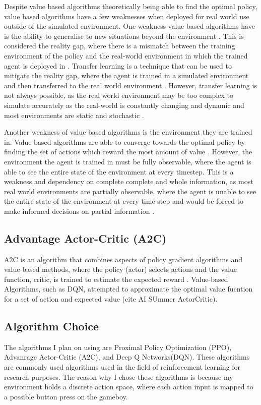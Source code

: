 Despite value based algorithms theoretically being able to find the optimal policy, value based algorithms have a few weaknesses when deployed for real world use outside of the simulated environment. One weakness value based algorithms have is the ability to generalise to new situations beyond the environment \cite{OdelTruxillo2023}. This is considered the reality gap, where there is a mismatch between the training environment of the policy and the real-world environment in which the trained agent is deployed in \cite{tobin2017domain}. Transfer learning is a technique that can be used to mitigate the reality gap, where the agent is trained in a simulated environment and then transferred to the real world environment \cite{OdelTruxillo2023}. However, transfer learning is not always possible, as the real world environment may be too complex to simulate accurately as the real-world is constantly changing and dynamic and most environments are static and stochastic \cite{OdelTruxillo2023}. 

Another weakness of value based algorithms is the environment they are trained in. Value based algorithms are able to converge towards the optimal policy by finding the set of actions which reward the most amount of value \cite{OdelTruxillo2023}. However, the environment the agent is trained in must be fully observable, where the agent is able to see the entire state of the environment at every timestep. This is a weakness and dependency on complete complete and whole information, as most real world environments are partially observable, where the agent is unable to see the entire state of the environment at every time step and would be forced to make informed decisions on partial information \cite{dulac2021challenges}. 

\subsection{Advantage Actor-Critic (A2C)}

A2C is an algorithm that combines aspects of policy gradient algorithms and value-based methods, where the policy (actor) selects actions and the value function, critic, is trained to estimate the expected reward \cite{mnih2013playing}. Value-based Algorithms, such as DQN, attempted to approximate the optimal value fucntion for a set of action and expected value (cite AI SUmmer ActorCritic). 


\subsection{Algorithm Choice}

The algorithms I plan on using are Proximal Policy Optimization (PPO), Advanrage Actor-Critic (A2C), and Deep Q Networks(DQN). These algorithms are commonly used algorithms used in the field of reinforcement learning for research purposes. The reason why I chose these algorithms is because my environment holds a discrete action space, where each action input is mapped to a possible button press on the gameboy.

